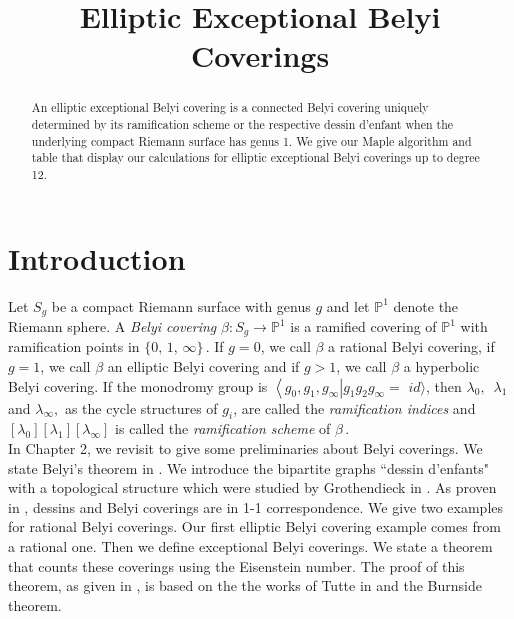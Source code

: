 
\title{Elliptic Exceptional Belyi Coverings}
\begin{abstract} An elliptic exceptional Belyi covering is a connected Belyi covering uniquely determined by its ramification scheme or the respective dessin d’enfant when the underlying compact Riemann surface has genus 1. We give our Maple algorithm and table that display our calculations for elliptic exceptional Belyi coverings up to degree 12.
\end{abstract}
\maketitle

\tableofcontents
\section{Introduction}
Let $S_g$ be a compact Riemann surface with genus $g$ and let $\mathbb{P}^1$ denote the Riemann sphere. A {\it Belyi covering} $\beta: S_g \to \mathbb{P}^1$ is a ramified covering of $\mathbb{P}^1$ with ramification points in $\{0,\,1,\,\infty\}\,.$ If $g=0$, we call $\beta$ a rational Belyi covering, if $g=1$, we call $\beta$ an elliptic Belyi covering and if $g>1$, we call $\beta$ a hyperbolic Belyi covering. If the monodromy group is $\left\langle g_{0}, g_{1}, g_{\infty}\right| g_{1} g_{2} g_{\infty}=$ $i d\rangle$, then $\lambda_{0},\,$ $\lambda_{1}\,$ and $\lambda_{\infty},$ as the cycle structures of $g_i$, are called the \textit{ramification indices} and $\left[\lambda_{0}\right]\left[\lambda_{1}\right]\left[\lambda_{\infty}\right]$ is called the \textit{ramification scheme} of $\beta\,.$\\

In Chapter 2, we revisit \cite{Ku} to give some preliminaries about Belyi coverings. We state Belyi's theorem in \cite{Belyi}. We introduce the bipartite graphs ``dessin d'enfants" with a topological structure which were studied by Grothendieck in \cite{Groth}. As proven in \cite{Zvo}, dessins and Belyi coverings are in 1-1 correspondence. We give two examples for rational Belyi coverings. Our first elliptic Belyi covering example comes from a rational one. Then we define exceptional Belyi coverings. We state a theorem that counts these coverings using the Eisenstein number. The proof of this theorem, as given in \cite{Kurk}, is based on the the works of Tutte in \cite{Tut} and the Burnside theorem. \\

